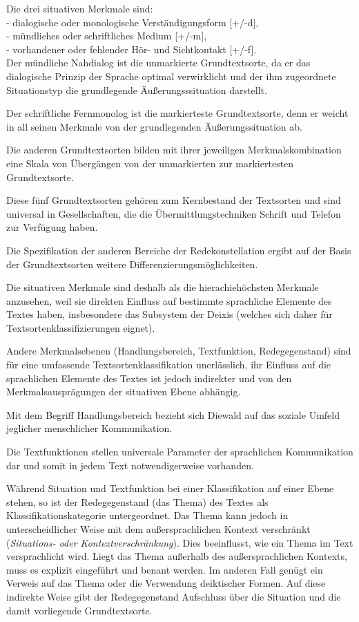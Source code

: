 \documentclass[
  letterpaper,
]{scrbook}
\begin{document}
Die drei situativen Merkmale sind:\\
- dialogische oder monologische Verständigungsform {[}+/-d{]},\\
- mündliches oder schriftliches Medium {[}+/-m{]},\\
- vorhandener oder fehlender Hör- und Sichtkontakt {[}+/-f{]}.\\

Der mündliche Nahdialog ist die unmarkierte Grundtextsorte, da er das
dialogische Prinzip der Sprache optimal verwirklicht und der ihm
zugeordnete Situationstyp die grundlegende Äußerungsssituation
darstellt.

Der schriftliche Fernmonolog ist die markierteste Grundtextsorte, denn
er weicht in all seinen Merkmale von der grundlegenden
Äußerungssituation ab.

Die anderen Grundtextsorten bilden mit ihrer jeweiligen
Merkmalskombination eine Skala von Übergängen von der unmarkierten zur
markiertesten Grundtextsorte.

Diese fünf Grundtextsorten gehören zum Kernbestand der Textsorten und
sind universal in Gesellschaften, die die Übermittlungstechniken Schrift
und Telefon zur Verfügung haben.

Die Spezifikation der anderen Bereiche der Redekonstellation ergibt auf
der Basis der Grundtextsorten weitere Differenzierungsmöglichkeiten.

Die situativen Merkmale sind deshalb als die hierachiehöchsten Merkmale
anzusehen, weil sie direkten Einfluss auf bestimmte sprachliche Elemente
des Textes haben, insbesondere das Subsystem der Deixis (welches sich
daher für Textsortenklassifizierungen eignet).

Andere Merkmalsebenen (Handlungsbereich, Textfunktion, Redegegenstand)
sind für eine umfassende Textsortenklassifikation unerlässlich, ihr
Einfluss auf die sprachlichen Elemente des Textes ist jedoch indirekter
und von den Merkmalsausprägungen der situativen Ebene abhängig.

Mit dem Begriff Handlungsbereich bezieht sich Diewald auf das soziale
Umfeld jeglicher menschlicher Kommunikation.

Die Textfunktionen stellen universale Parameter der sprachlichen
Kommunikation dar und somit in jedem Text notwendigerweise vorhanden.

Während Situation und Textfunktion bei einer Klassifikation auf einer
Ebene stehen, so ist der Redegegenstand (das Thema) des Textes als
Klassifikationskategorie untergeordnet. Das Thema kann jedoch in
unterscheidlicher Weise mit dem außersprachlichen Kontext verschränkt
(\emph{Situations- oder Kontextverschränkung}). Dies beeinflusst, wie
ein Thema im Text versprachlicht wird. Liegt das Thema außerhalb des
außersprachlichen Kontexts, muss es explizit eingeführt und benant
werden. Im anderen Fall genügt ein Verweis auf das Thema oder die
Verwendung deiktischer Formen. Auf diese indirekte Weise gibt der
Redegegenstand Aufschluss über die Situation und die damit vorliegende
Grundtextsorte.
\end{document}
